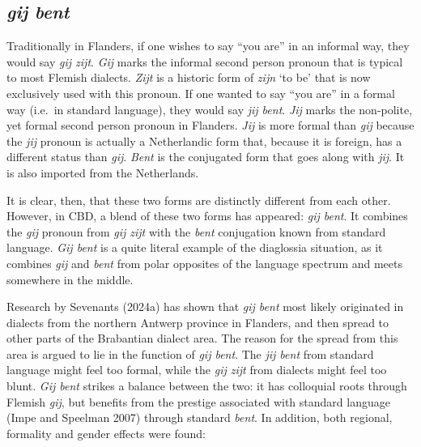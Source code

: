 \documentclass[
  letterpaper,
  DIV=11,
  numbers=noendperiod,
  oneside]{scrartcl}
\begin{document}
\subsection{\texorpdfstring{\emph{gij bent}}{gij bent}}\label{gij-bent}

Traditionally in Flanders, if one wishes to say ``you are'' in an
informal way, they would say \emph{gij zijt}. \emph{Gij} marks the
informal second person pronoun that is typical to most Flemish dialects.
\emph{Zijt} is a historic form of \emph{zijn} `to be' that is now
exclusively used with this pronoun. If one wanted to say ``you are'' in
a formal way (i.e.~in standard language), they would say \emph{jij
bent}. \emph{Jij} marks the non-polite, yet formal second person pronoun
in Flanders. \emph{Jij} is more formal than \emph{gij} because the
\emph{jij} pronoun is actually a Netherlandic form that, because it is
foreign, has a different status than \emph{gij}. \emph{Bent} is the
conjugated form that goes along with \emph{jij}. It is also imported
from the Netherlands.

It is clear, then, that these two forms are distinctly different from
each other. However, in CBD, a blend of these two forms has appeared:
\emph{gij bent}. It combines the \emph{gij} pronoun from \emph{gij zijt}
with the \emph{bent} conjugation known from standard language. \emph{Gij
bent} is a quite literal example of the diaglossia situation, as it
combines \emph{gij} and \emph{bent} from polar opposites of the language
spectrum and meets somewhere in the middle.

Research by Sevenants (2024a) has shown that \emph{gij bent} most likely
originated in dialects from the northern Antwerp province in Flanders,
and then spread to other parts of the Brabantian dialect
area. The reason for the spread from this area is argued
to lie in the function of \emph{gij bent}. The \emph{jij bent} from
standard language might feel too formal, while the \emph{gij zijt} from
dialects might feel too blunt. \emph{Gij bent} strikes a balance between
the two: it has colloquial roots through Flemish \emph{gij}, but
benefits from the prestige associated with standard language (Impe and
Speelman 2007) through standard \emph{bent}. In addition, both regional,
formality and gender effects were found:
\end{document}
